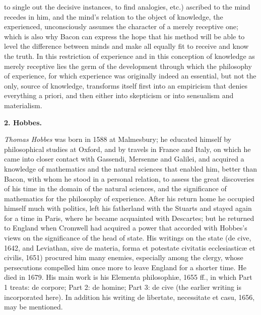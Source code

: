 to single out the decisive instances, to find analogies, etc.) ascribed to the mind recedes in him, and the mind's relation to the object of knowledge, the experienced, unconsciously assumes the character of a merely receptive one; which is also why Bacon can express the hope that his method will be able to level the difference between minds and make all equally fit to receive and know the truth. In this restriction of experience and in this conception of knowledge as merely receptive lies the germ of the development through which the philosophy of experience, for which experience was originally indeed an essential, but not the only, source of knowledge, transforms itself first into an empiricism that denies everything a priori, and then either into skepticism or into sensualism and materialism.

\divrule

\begin{center}
  \textbf{2. Hobbes.}
\end{center}

\emph{Thomas Hobbes} was born in 1588 at Malmesbury; he educated himself by philosophical studies at Oxford, and by travels in France and Italy, on which he came into closer contact with Gassendi, Mersenne and Galilei, and acquired a knowledge of mathematics and the natural sciences that enabled him, better than Bacon, with whom he stood in a personal relation, to assess the great discoveries of his time in the domain of the natural sciences, and the significance of mathematics for the philosophy of experience. After his return home he occupied himself much with politics, left his fatherland with the Stuarts and stayed again for a time in Paris, where he became acquainted with Descartes; but he returned to England when Cromwell had acquired a power that accorded with Hobbes's views on the significance of the head of state. His writings on the state (de cive, 1642, and Leviathan, sive de materia, forma et potestate civitatis ecclesiasticæ et civilis, 1651) procured him many enemies, especially among the clergy, whose persecutions compelled him once more to leave England for a shorter time. He died in 1679. His main work is his Elementa philosophiæ, 1655 ff., in which Part 1 treats: de corpore; Part 2: de homine; Part 3: de cive (the earlier writing is incorporated here). In addition his writing de libertate, necessitate et casu, 1656, may be mentioned.

\divrule

